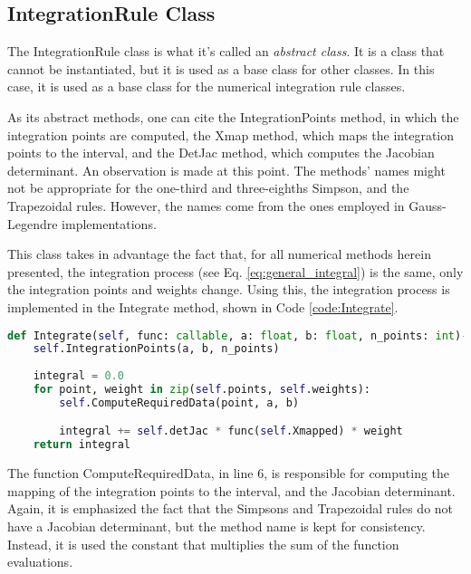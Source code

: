 \subsection{IntegrationRule Class}
The IntegrationRule class is what it's called an \textit{abstract class}. It is a class that cannot be instantiated, but it is used as a base class for other classes. In this case, it is used as a base class for the numerical integration rule classes. 

As its abstract methods, one can cite the IntegrationPoints method, in which the integration points are computed, the Xmap method, which maps the integration points to the interval, and the DetJac method, which computes the Jacobian determinant. An observation is made at this point. The methods' names might not be appropriate for the one-third and three-eighths Simpson, and the Trapezoidal rules. However, the names come from the ones employed in Gauss-Legendre implementations. 

This class takes in advantage the fact that, for all numerical methods herein presented, the integration process (see Eq. \eqref{eq:general_integral}) is the same, only the integration points and weights change. Using this, the integration process is implemented in the Integrate method, shown in Code \ref{code:Integrate}.
\begin{lstlisting}[language=python, caption={Integrate Method.}, label={code:Integrate}]
def Integrate(self, func: callable, a: float, b: float, n_points: int)->float:
    self.IntegrationPoints(a, b, n_points)
    
    integral = 0.0
    for point, weight in zip(self.points, self.weights):
        self.ComputeRequiredData(point, a, b)

        integral += self.detJac * func(self.Xmapped) * weight 
    return integral
\end{lstlisting}

The function ComputeRequiredData, in line 6, is responsible for computing the mapping of the integration points to the interval, and the Jacobian determinant. Again, it is emphasized the fact that the Simpsons and Trapezoidal rules do not have a Jacobian determinant, but the method name is kept for consistency. Instead, it is used the constant that multiplies the sum of the function evaluations. 

